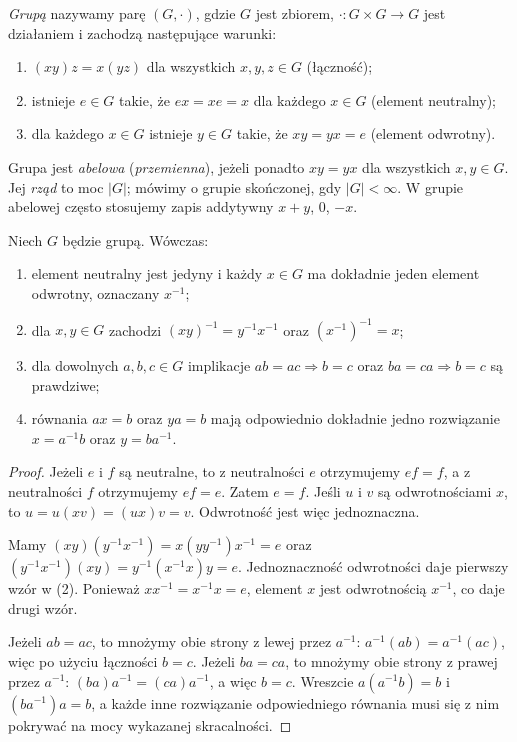 \begin{definicja}[Grupa]
\label{aa:def:grupa}
\emph{Grupą} nazywamy parę $(G,\cdot)$, gdzie $G$ jest zbiorem,
$\cdot:G\times G\to G$ jest działaniem i zachodzą następujące warunki:
\begin{enumerate}
\item $(xy)z=x(yz)$ dla wszystkich $x,y,z\in G$ (łączność);
\item istnieje $e\in G$ takie, że $ex=xe=x$ dla każdego $x\in G$
(element neutralny);
\item dla każdego $x\in G$ istnieje $y\in G$ takie, że $xy=yx=e$
(element odwrotny).
\end{enumerate}
Grupa jest \emph{abelowa} (\emph{przemienna}), jeżeli ponadto $xy=yx$
dla wszystkich $x,y\in G$. Jej \emph{rząd} to moc $|G|$;
mówimy o grupie skończonej, gdy $|G|<\infty$.
W grupie abelowej często stosujemy zapis addytywny $x+y$, $0$, $-x$.
\end{definicja}

\begin{lemat}
\label{aa:lem:jedynka-odwrotnosc}
Niech $G$ będzie grupą. Wówczas:
\begin{enumerate}
\item element neutralny jest jedyny i każdy $x\in G$ ma dokładnie
jeden element odwrotny, oznaczany $x^{-1}$;
\item dla $x,y\in G$ zachodzi $(xy)^{-1}=y^{-1}x^{-1}$ oraz
$(x^{-1})^{-1}=x$;
\item dla dowolnych $a,b,c\in G$ implikacje
$ab=ac\Rightarrow b=c$ oraz $ba=ca\Rightarrow b=c$ są prawdziwe;
\item równania $ax=b$ oraz $ya=b$ mają odpowiednio dokładnie jedno
rozwiązanie $x=a^{-1}b$ oraz $y=ba^{-1}$.
\end{enumerate}
\end{lemat}
\begin{proof}
Jeżeli $e$ i $f$ są neutralne, to z neutralności $e$ otrzymujemy
$ef=f$, a z neutralności $f$ otrzymujemy $ef=e$. Zatem $e=f$.
Jeśli $u$ i $v$ są odwrotnościami $x$, to
$u=u(xv)=(ux)v=v$. Odwrotność jest więc jednoznaczna.

Mamy $(xy)(y^{-1}x^{-1})=x(yy^{-1})x^{-1}=e$ oraz
$(y^{-1}x^{-1})(xy)=y^{-1}(x^{-1}x)y=e$.
Jednoznaczność odwrotności daje pierwszy wzór w (2).
Ponieważ $xx^{-1}=x^{-1}x=e$, element $x$ jest odwrotnością
$x^{-1}$, co daje drugi wzór.

Jeżeli $ab=ac$, to mnożymy obie strony z lewej przez $a^{-1}$:
$a^{-1}(ab)=a^{-1}(ac)$, więc po użyciu łączności $b=c$.
Jeżeli $ba=ca$, to mnożymy obie strony z prawej przez $a^{-1}$:
$(ba)a^{-1}=(ca)a^{-1}$, a więc $b=c$.
Wreszcie $a(a^{-1}b)=b$ i $(ba^{-1})a=b$,
a każde inne rozwiązanie odpowiedniego równania musi się z nim
pokrywać na mocy wykazanej skracalności.
\end{proof}

